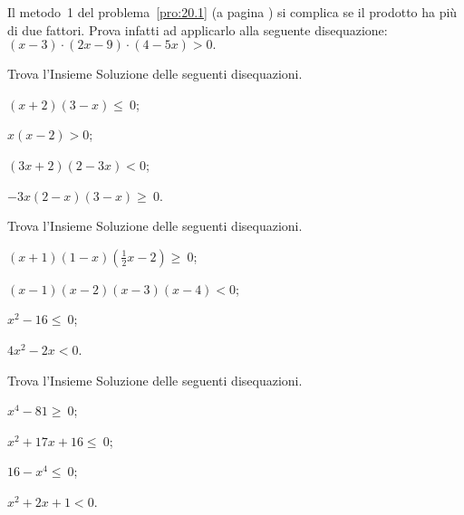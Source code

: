\begin{esercizio}
 \label{ese:20.43}
 Il metodo~1 del problema~\ref{pro:20.1} (a pagina \pageref{pro:20.1}) si complica se il prodotto ha
più di due fattori. Prova infatti ad applicarlo alla seguente
disequazione:
$(x-3)\cdot (2x-9)\cdot (4-5x)>0.$
\end{esercizio}
\pagebreak

\begin{esercizio}[\Ast]
 \label{ese:20.44}
Trova l'Insieme Soluzione delle seguenti disequazioni.
\begin{multicols}{2}
 \begin{enumeratea}
 \item $(x+2)(3-x)\le~0$;
\item $x(x-2)>0$;
\item $(3x+2)(2-3x)<0$;
\item $-3x(2-x)(3-x)\ge~0$.
\end{enumeratea}
\end{multicols}
\end{esercizio}

\begin{esercizio}[\Ast]
 \label{ese:20.45}
Trova l'Insieme Soluzione delle seguenti disequazioni.
\begin{multicols}{2}
 \begin{enumeratea}
 \item $(x+1)(1-x)\left(\frac{1}{2}x-2\right)\ge~0$;
\item $(x-1)(x-2)(x-3)(x-4)<0$;
\item $x^{2}-16\le~0$;
\item $4x^{2}-2x<0$.
\end{enumeratea}
\end{multicols}
\end{esercizio}

\begin{esercizio}[\Ast]
 \label{ese:20.46}
Trova l'Insieme Soluzione delle seguenti disequazioni.
\begin{multicols}{2}
 \begin{enumeratea}
 \item $x^{4}-81\ge~0$;
\item $x^{2}+17x+16\le~0$;
\item $16-x^{4}\le~0$;
\item $x^{2}+2x+1<0$.
\end{enumeratea}
\end{multicols}
\end{esercizio}

